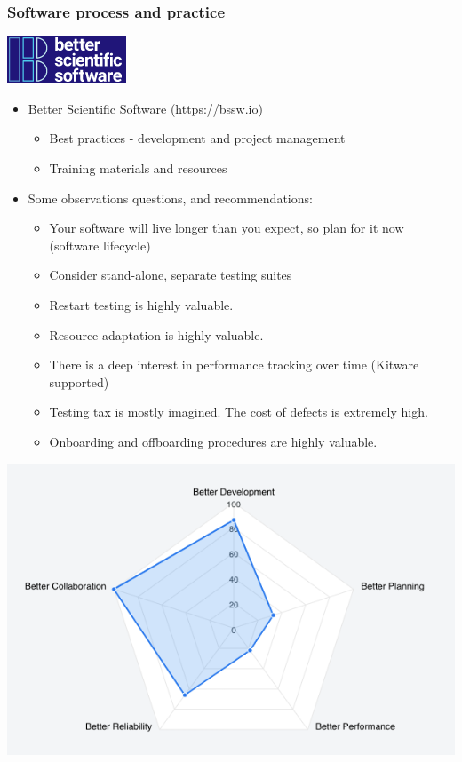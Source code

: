 \begin{frame}\frametitle{Software process and practice}\hspace{200pt}\includegraphics[width=.1\textwidth]{figures/bss.png}
\begin{multicols}{2}
\begin{itemize}
\item Better Scientific Software (https://bssw.io)
\begin{itemize}
\item Best practices - development and project management
\item Training materials and resources
\end{itemize}
\item Some observations questions, and recommendations:
\begin{itemize}
\item Your software will live longer than you expect, so plan for it now (software lifecycle)
\item Consider stand-alone, separate testing suites
\item Restart testing is highly valuable.
\item Resource adaptation is highly valuable.
\item There is a deep interest in performance tracking over time (Kitware supported)
\item Testing tax is mostly imagined.  The cost of defects is extremely high.
\item Onboarding and offboarding procedures are highly valuable.
\end{itemize}
\end{itemize}
\includegraphics[width=.4\textwidth]{figures/mirge_devel_process_eval.png}
\end{multicols}
\end{frame}



